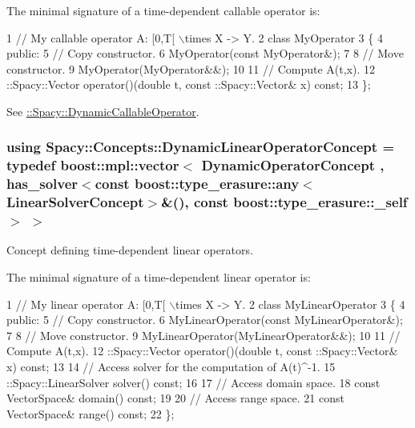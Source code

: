 \label{group__ConceptGroup_ga30692db093ead5a1a074905363a2f043_DynamicCallableOperatorConceptAnchor}%
\hypertarget{group__ConceptGroup_ga30692db093ead5a1a074905363a2f043_DynamicCallableOperatorConceptAnchor}{}%
The minimal signature of a time-\/dependent callable operator is\+: 
\begin{DoxyCode}
1 // My callable operator A: [0,T[ \(\backslash\)times X -> Y.
2 class MyOperator
3 \{
4 public:
5   // Copy constructor.
6   MyOperator(const MyOperator&);
7 
8   // Move constructor.
9   MyOperator(MyOperator&&);
10 
11   // Compute A(t,x).
12   ::Spacy::Vector operator()(double t, const ::Spacy::Vector& x) const;
13 \};
\end{DoxyCode}


See \hyperlink{group__SpacyGroup_ga750d55072f7a3a16a1263961147333c0_DynamicCallableOperatorAnchor}{\+:\+:Spacy\+:\+:Dynamic\+Callable\+Operator}. \hypertarget{group__ConceptGroup_ga015b0d099011a2ef73a16aa9b36a7346_ga015b0d099011a2ef73a16aa9b36a7346}{}
\subsubsection[{Dynamic\+Linear\+Operator\+Concept}]{\setlength{\rightskip}{0pt plus 5cm}using {\bf Spacy\+::\+Concepts\+::\+Dynamic\+Linear\+Operator\+Concept} = typedef boost\+::mpl\+::vector$<$ Dynamic\+Operator\+Concept , has\+\_\+solver$<$const boost\+::type\+\_\+erasure\+::any$<$Linear\+Solver\+Concept$>$\&(), const boost\+::type\+\_\+erasure\+::\+\_\+self$>$ $>$}\label{group__ConceptGroup_ga015b0d099011a2ef73a16aa9b36a7346_ga015b0d099011a2ef73a16aa9b36a7346}


Concept defining time-\/dependent linear operators. 

\label{group__ConceptGroup_ga015b0d099011a2ef73a16aa9b36a7346_DynamicLinearOperatorConceptAnchor}%
\hypertarget{group__ConceptGroup_ga015b0d099011a2ef73a16aa9b36a7346_DynamicLinearOperatorConceptAnchor}{}%
The minimal signature of a time-\/dependent linear operator is\+: 
\begin{DoxyCode}
1 // My linear operator A: [0,T[ \(\backslash\)times X -> Y.
2 class MyLinearOperator
3 \{
4 public:
5   // Copy constructor.
6   MyLinearOperator(const MyLinearOperator&);
7 
8   // Move constructor.
9   MyLinearOperator(MyLinearOperator&&);
10 
11   // Compute A(t,x).
12   ::Spacy::Vector operator()(double t, const ::Spacy::Vector& x) const;
13 
14   // Access solver for the computation of A(t)^-1.
15   ::Spacy::LinearSolver solver() const;
16 
17   // Access domain space.
18   const VectorSpace& domain() const;
19 
20   // Access range space.
21   const VectorSpace& range() const;
22 \};
\end{DoxyCode}


